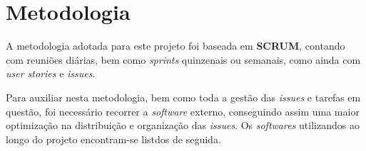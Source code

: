 
\section{Metodologia}

A metodologia adotada para este projeto foi baseada em \textbf{SCRUM}, contando com reuniões diárias, bem como \textit{sprints} quinzenais ou semanais, como ainda com \textit{user stories} e \textit{issues}.

Para auxiliar nesta metodologia, bem como toda a gestão das \textit{issues} e tarefas em questão, foi necessário recorrer a \textit{software} externo, conseguindo assim uma maior optimização na distribuição e organização das \textit{issues}. Os \textit{softwares} utilizandos ao longo do projeto encontram-se listdos de seguida.






